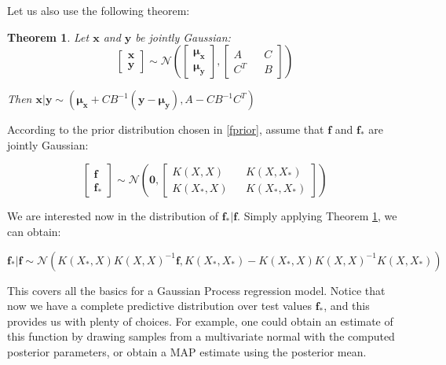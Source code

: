 \documentclass[10pt,a4paper,twoside]{book}
\newtheorem{mydef}{Theorem}
\begin{document}
Let us also use the following theorem:

\begin{mydef}
\label{conditioning}
Let $\boldsymbol{x}$ and $\boldsymbol{y}$ be jointly Gaussian:
\begin{equation}
\begin{bmatrix}
\boldsymbol{x}\\
\boldsymbol{y}
\end{bmatrix} \sim \mathcal{N}\left(
\begin{bmatrix}
\boldsymbol{\mu_x}\\
\boldsymbol{\mu_y}
\end{bmatrix},
\begin{bmatrix}
A   && C \\
C^T && B
\end{bmatrix}
\right)
\end{equation}

Then $\boldsymbol{x|y} \sim \left(\boldsymbol{\mu_x} + C B^{-1}(\boldsymbol{y} - \boldsymbol{\mu_y}), A - CB^{-1}C^T \right)$
\end{mydef}

According to the prior distribution chosen in \ref{fprior}, assume that $\boldsymbol{f}$ and $\boldsymbol{f_*}$ are jointly Gaussian:

\begin{equation}
\begin{bmatrix}
\boldsymbol{f}\\
\boldsymbol{f_*}
\end{bmatrix} \sim \mathcal{N}\left(
\boldsymbol{0},
\begin{bmatrix}
K(X, X)  && K(X, X_*) \\
K(X_*, X) && K(X_*, X_*)
\end{bmatrix}
\right)
\end{equation}


We are interested now in the distribution of $\boldsymbol{f_{*}}|\boldsymbol{f}$. Simply applying Theorem \ref{conditioning}, we can obtain:

\begin{equation}
\boldsymbol{f_*|f} \sim \mathcal{N}\left(K(X_*, X)K(X, X)^{-1}\boldsymbol{f}, K(X_*, X_*) - K(X_*, X)K(X, X)^{-1}K(X, X_*) \right)
\end{equation}

This covers all the basics for a Gaussian Process regression model. Notice that now we have a complete predictive distribution over test values $\boldsymbol{f_{*}}$, and this provides us with plenty of choices. For example, one could obtain an estimate of this function by drawing samples from a multivariate normal with the computed posterior parameters, or obtain a MAP estimate using the posterior mean.\\
\end{document}
